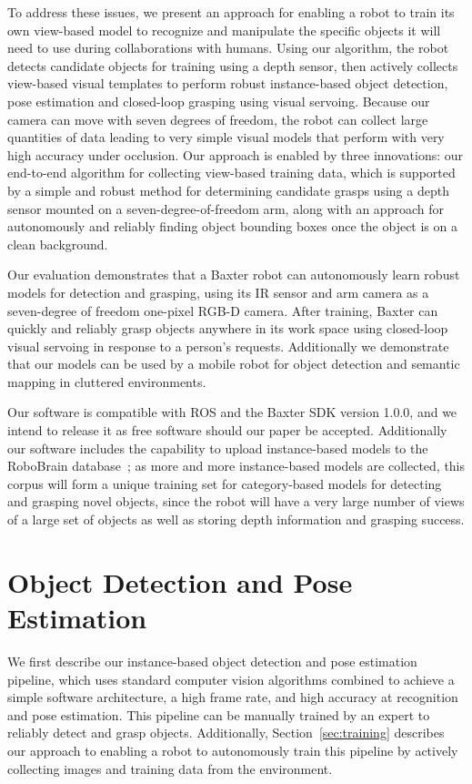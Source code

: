 \documentclass[conference]{IEEEtran}
\begin{document}
To address these issues, we present an approach for enabling a robot
to train its own view-based model to recognize and manipulate the
specific objects it will need to use during collaborations with
humans.  Using our algorithm, the robot detects candidate objects for
training using a depth sensor, then actively collects view-based
visual templates to perform robust instance-based object detection,
pose estimation and closed-loop grasping using visual servoing.
Because our camera can move with seven degrees of freedom, the robot
can collect large quantities of data leading to very simple visual
models that perform with very high accuracy under occlusion.  Our
approach is enabled by three innovations: our end-to-end algorithm for
collecting view-based training data, which is supported by a simple
and robust method for determining candidate grasps using a depth
sensor mounted on a seven-degree-of-freedom arm, along with an
approach for autonomously and reliably finding object bounding boxes
once the object is on a clean background.

Our evaluation demonstrates that a Baxter robot can autonomously learn
robust models for detection and grasping, using its IR sensor and arm
camera as a seven-degree of freedom one-pixel RGB-D camera.  After
training, Baxter can quickly and reliably grasp objects anywhere in
its work space using closed-loop visual servoing in response to a
person's requests.  Additionally we demonstrate that our models can be
used by a mobile robot for object detection and semantic mapping in
cluttered environments.

Our software is compatible with ROS and the Baxter SDK version 1.0.0,
and we intend to release it as free software should our paper be
accepted.  Additionally our software includes the capability to upload
instance-based models to the RoboBrain database~\citep{x}; as more and
more instance-based models are collected, this corpus will form a
unique training set for category-based models for detecting and
grasping novel objects, since the robot will have a very large number
of views of a large set of objects as well as storing depth
information and grasping success.


\section{Object Detection and Pose Estimation}

We first describe our instance-based object detection and pose
estimation pipeline, which uses standard computer vision algorithms
combined to achieve a simple software architecture, a high frame rate,
and high accuracy at recognition and pose estimation.  This pipeline
can be manually trained by an expert to reliably detect and grasp
objects.  Additionally, Section~\ref{sec:training} describes our
approach to enabling a robot to autonomously train this pipeline by
actively collecting images and training data from the environment.
\end{document}
